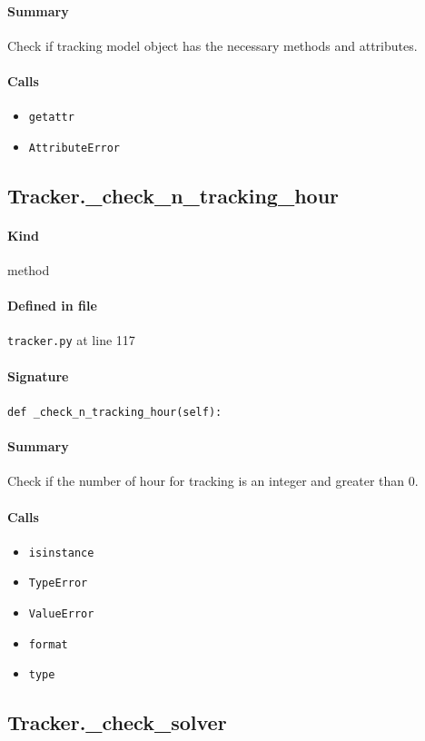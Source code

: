 \documentclass[11pt]{report}
\begin{document}
\paragraph{Summary} Check if tracking model object has the necessary methods and attributes.
\paragraph{Calls}
\begin{itemize}[leftmargin=*]
  \item \texttt{getattr}
  \item \texttt{AttributeError}
\end{itemize}
\subsection{Tracker.\_check\_n\_tracking\_hour}
\label{def:tracker.py:Tracker._check_n_tracking_hour:L117}
\paragraph{Kind} method
\paragraph{Defined in file} \texttt{tracker.py} at line 117
\paragraph{Signature} \texttt{def \_check\_n\_tracking\_hour(self):}
\paragraph{Summary} Check if the number of hour for tracking is an integer and greater than 0.
\paragraph{Calls}
\begin{itemize}[leftmargin=*]
  \item \texttt{isinstance}
  \item \texttt{TypeError}
  \item \texttt{ValueError}
  \item \texttt{format}
  \item \texttt{type}
\end{itemize}
\subsection{Tracker.\_check\_solver}
\label{def:tracker.py:Tracker._check_solver:L135}
\end{document}
